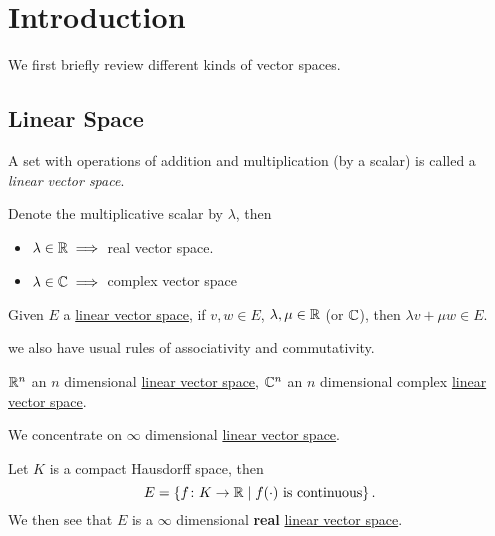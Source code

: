 \chapter{Introduction}

We first briefly review different kinds of vector spaces.

\section{Linear Space}

\begin{definition}\label{def:linear-vector-space}
	A set with operations of addition and multiplication (by a scalar) is called a \emph{linear vector space}.
\end{definition}

\begin{eg}
	Denote the multiplicative scalar by \(\lambda \), then
	\begin{itemize}
		\item \(\lambda \in \mathbb{\MakeUppercase{r}} \implies\) real vector space.
		\item \(\lambda \in \mathbb{\MakeUppercase{c}} \implies \) complex vector space
	\end{itemize}
\end{eg}

\begin{lemma}
	Given \(E\) a \hyperref[def:linear-vector-space]{linear vector space}, if \(v, w\in E\), \(\lambda , \mu \in \mathbb{\MakeUppercase{r}} \) (or \(\mathbb{\MakeUppercase{c}} \)), then \(\lambda v + \mu w\in E\).
\end{lemma}

we also have usual rules of associativity and commutativity.

\begin{eg}
	\(\mathbb{\MakeUppercase{r}} ^n\) an \(n\) dimensional \hyperref[def:linear-vector-space]{linear vector space}, \(\mathbb{\MakeUppercase{c}} ^n\) an \(n\) dimensional complex \hyperref[def:linear-vector-space]{linear vector space}.
\end{eg}

We concentrate on \(\infty \) dimensional \hyperref[def:linear-vector-space]{linear vector space}.

\begin{eg}
	Let \(K\) is a compact Hausdorff space, then
	\[
		E = \left\{ f\colon K\to \mathbb{\MakeUppercase{r}} \mid f(\cdot) \text{ is continuous}  \right\}.
	\]
	We then see that \(E\) is a \(\infty\) dimensional \textbf{real} \hyperref[def:linear-vector-space]{linear vector space}.
\end{eg}

